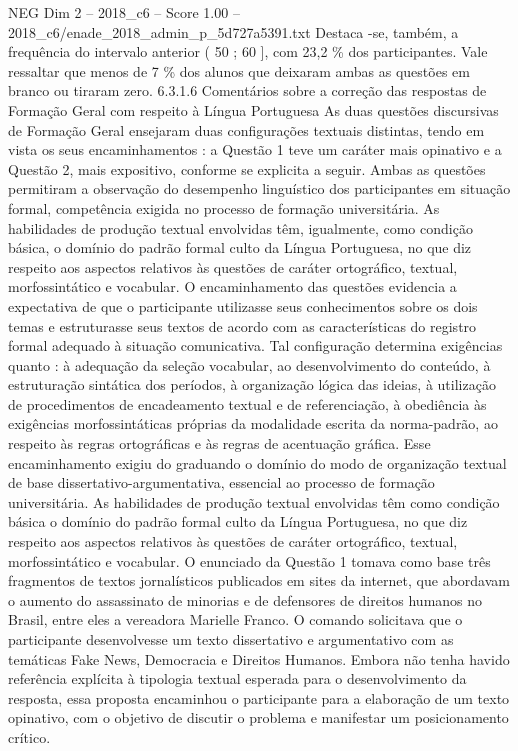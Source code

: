 \begin{textsample}{NEG Dim 2 – 2018\_c6 – Score 1.00 – 2018\_c6/enade\_2018\_admin\_p\_5d727a5391.txt}
Destaca -se, também, a frequência do intervalo anterior ( 50 ; 60 ], com 23,2 \% dos participantes.
Vale ressaltar que menos de 7 \% dos alunos que deixaram ambas as questões em branco ou tiraram zero. 6.3.1.6 Comentários sobre a correção das respostas de Formação Geral com respeito à Língua Portuguesa As duas questões discursivas de Formação Geral ensejaram duas configurações textuais distintas, tendo em vista os seus encaminhamentos : a Questão 1 teve um caráter mais opinativo e a Questão 2, mais expositivo, conforme se explicita a seguir.
Ambas as questões permitiram a observação do desempenho linguístico dos participantes em situação formal, competência exigida no processo de formação universitária.
As habilidades de produção textual envolvidas têm, igualmente, como condição básica, o domínio do padrão formal culto da Língua Portuguesa, no que diz respeito aos aspectos relativos às questões de caráter ortográfico, textual, morfossintático e vocabular.
O encaminhamento das questões evidencia a expectativa de que o participante utilizasse seus conhecimentos sobre os dois temas e estruturasse seus textos de acordo com as características do registro formal adequado à situação comunicativa.
Tal configuração determina exigências quanto : à adequação da seleção vocabular, ao desenvolvimento do conteúdo, à estruturação sintática dos períodos, à organização lógica das ideias, à utilização de procedimentos de encadeamento textual e de referenciação, à obediência às exigências morfossintáticas próprias da modalidade escrita da norma-padrão, ao respeito às regras ortográficas e às regras de acentuação gráfica.
Esse encaminhamento exigiu do graduando o domínio do modo de organização textual de base dissertativo-argumentativa, essencial ao processo de formação universitária.
As habilidades de produção textual envolvidas têm como condição básica o domínio do padrão formal culto da Língua Portuguesa, no que diz respeito aos aspectos relativos às questões de caráter ortográfico, textual, morfossintático e vocabular.
O enunciado da Questão 1 tomava como base três fragmentos de textos jornalísticos publicados em sites da internet, que abordavam o aumento do assassinato de minorias e de defensores de direitos humanos no Brasil, entre eles a vereadora Marielle Franco.
O comando solicitava que o participante desenvolvesse um texto dissertativo e argumentativo com as temáticas Fake News, Democracia e Direitos Humanos.
Embora não tenha havido referência explícita à tipologia textual esperada para o desenvolvimento da resposta, essa proposta encaminhou o participante para a elaboração de um texto opinativo, com o objetivo de discutir o problema e manifestar um posicionamento crítico.

\end{textsample}
